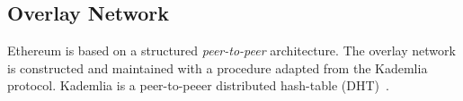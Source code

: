 \subsection{Overlay Network}
Ethereum is based on a structured \emph{peer-to-peer} architecture.
The overlay network is constructed and maintained with a procedure
adapted from the Kademlia protocol.
Kademlia is a peer-to-peeer distributed hash-table (DHT)~\cite{bib:kademlia}.


